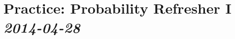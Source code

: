 \section[Practice: Probability Refresher I]{Practice: Probability Refresher I \small{\textit{2014-04-28}}}
